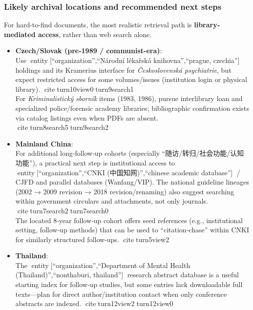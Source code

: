 \subsubsection{Likely archival locations and recommended next steps}\label{13_non_english-likely-archival-locations-and-recommended-next-steps}

For hard-to-find documents, the most realistic retrieval path is \textbf{library-mediated access}, rather than web search alone.

\begin{itemize}
\item
  \textbf{Czech/Slovak (pre‑1989 / communist-era)}:\\
  Use entity{[}``organization'',``Národní lékařská knihovna'',``prague, czechia''{]} holdings and its Kramerius interface for \emph{Československá psychiatrie}, but expect restricted access for some volumes/issues (institution login or physical library). citeturn10view0turn9search1\\
  For \emph{Kriminalistický sborník} items (1983, 1986), pursue interlibrary loan and specialized police/forensic academy libraries; bibliographic confirmation exists via catalog listings even when PDFs are absent. citeturn8search5turn9search2
\item
  \textbf{Mainland China}:\\
  For additional long‑follow‑up cohorts (especially ``随访/转归/社会功能/认知功能''), a practical next step is institutional access to entity{[}``organization'',``CNKI (中国知网)'',``chinese academic database''{]} / CJFD and parallel databases (Wanfang/VIP). The national guideline lineages (2002 → 2009 revision → 2018 revision/renaming) also suggest searching within government circulars and attachments, not only journals. citeturn7search2turn7search0\\
  The located 8‑year follow‑up cohort offers seed references (e.g., institutional setting, follow‑up methods) that can be used to ``citation‑chase'' within CNKI for similarly structured follow-ups. citeturn5view2
\item
  \textbf{Thailand}:\\
  The entity{[}``organization'',``Department of Mental Health (Thailand)'',``nonthaburi, thailand''{]} research abstract database is a useful starting index for follow‑up studies, but some entries lack downloadable full texts---plan for direct author/institution contact when only conference abstracts are indexed. citeturn12view2turn12view0\\

\end{itemize}
